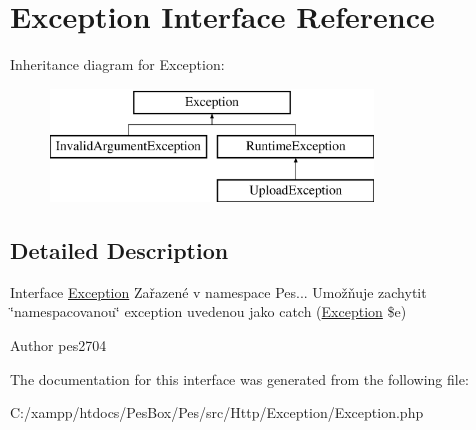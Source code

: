 \hypertarget{interface_pes_1_1_http_1_1_exception_1_1_exception}{}\section{Exception Interface Reference}
\label{interface_pes_1_1_http_1_1_exception_1_1_exception}
Inheritance diagram for Exception\+:\begin{figure}[H]
\begin{center}
\leavevmode
\includegraphics[height=3.000000cm]{interface_pes_1_1_http_1_1_exception_1_1_exception}
\end{center}
\end{figure}


\subsection{Detailed Description}
Interface \mbox{\hyperlink{interface_pes_1_1_http_1_1_exception_1_1_exception}{Exception}} Zařazené v namespace Pes... Umožňuje zachytit \char`\"{}namespacovanou\char`\"{} exception uvedenou jako catch (\mbox{\hyperlink{interface_pes_1_1_http_1_1_exception_1_1_exception}{Exception}} \$e)

\begin{DoxyAuthor}{Author}
pes2704 
\end{DoxyAuthor}


The documentation for this interface was generated from the following file\+:\begin{DoxyCompactItemize}
\item 
C\+:/xampp/htdocs/\+Pes\+Box/\+Pes/src/\+Http/\+Exception/Exception.\+php\end{DoxyCompactItemize}

